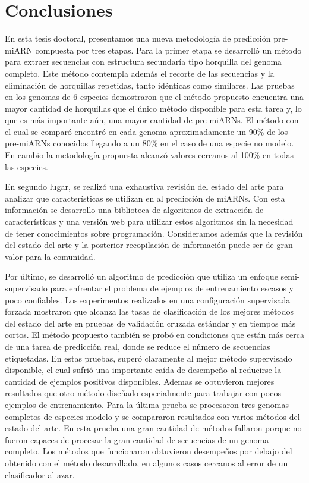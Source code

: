 \chapter{Conclusiones}
En esta tesis doctoral, presentamos una nueva metodología de predicción pre-miARN compuesta por tres etapas. Para la primer etapa se desarrolló un método para
extraer secuencias con estructura secundaría tipo horquilla del genoma completo. Este método contempla además el recorte de las secuencias y la eliminación de
horquillas repetidas, tanto idénticas como similares. Las pruebas en los genomas de 6 especies demostraron que el método propuesto encuentra una mayor cantidad
de horquillas que el único método disponible para esta tarea y, lo que es más importante aún, una mayor cantidad de pre-miARNs. El método con el cual se comparó
encontró en cada genoma aproximadamente un 90\% de los pre-miARNs conocidos llegando a un 80\% en el caso de una especie no modelo.  En cambio la metodología
propuesta alcanzó valores cercanos al 100\% en todas las especies.

En segundo lugar, se realizó una exhaustiva revisión del estado del arte para analizar que características se utilizan en al predicción de miARNs. Con esta
información se desarrollo una biblioteca de algoritmos de extracción de características y una versión web para utilizar estos algoritmos sin la necesidad de tener
conocimientos sobre programación. Consideramos además que la revisión del estado del arte y la posterior recopilación de información puede ser de gran valor
para la comunidad.

Por último, se desarrolló un algoritmo de predicción que utiliza un enfoque semi-supervisado para enfrentar el problema de ejemplos de entrenamiento escasos y
poco confiables. Los experimentos realizados en una configuración supervisada forzada mostraron que alcanza las tasas de clasificación de los mejores métodos
del estado del arte en pruebas de validación cruzada estándar y en tiempos más cortos. El método propuesto también se probó en condiciones que están más cerca
de una tarea de predicción real, donde se reduce el número de secuencias etiquetadas. En estas pruebas, superó claramente al mejor método supervisado
disponible, el cual sufrió una importante caída de desempeño al reducirse la cantidad de ejemplos positivos disponibles. Ademas se obtuvieron mejores resultados
que otro método diseñado especialmente para trabajar con pocos ejemplos de entrenamiento. Para la última prueba se procesaron tres genomas completos de especies
modelo y se compararon resultados con varios métodos del estado del arte. En esta prueba una gran cantidad de métodos fallaron porque no fueron capaces de
procesar la gran cantidad de secuencias de un genoma completo. Los métodos que funcionaron obtuvieron desempeños por debajo del obtenido con el método
desarrollado, en algunos casos cercanos al error de un clasificador al azar.



